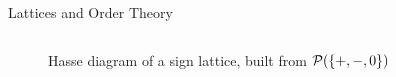 \documentclass[aspectratio=169]{beamer}
\begin{document}
\begin{frame}{Lattices and Order Theory}
\begin{columns}[T]
\begin{column}{0.4\textwidth}
\begin{figure}[h]
    \caption{\footnotesize Hasse diagram of a sign lattice, built from $\operatorname{\mathcal{P}}(\{+,-,0\})$}
  \end{figure}
  \end{column}
  \end{columns}
\end{frame}
\endgroup %
\end{document}
